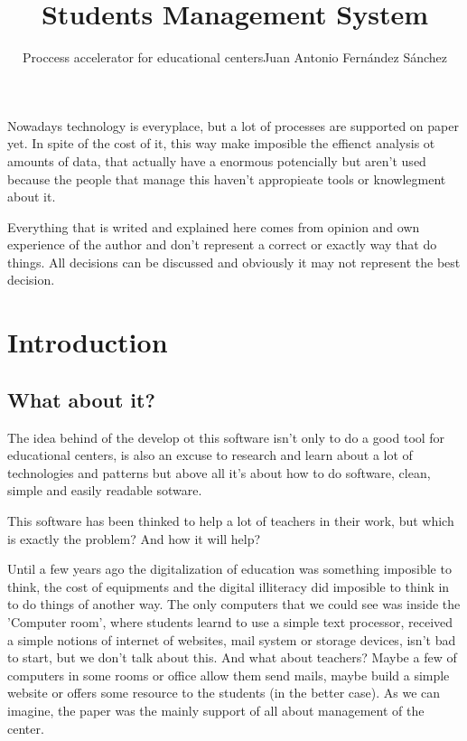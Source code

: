 \documentclass[oneside,english,titlepage]{scrbook}
\begin{document}
\title{Students Management System}

\subtitle{Proccess accelerator for educational centers}

\subtitle{Juan Antonio Fern\'andez S\'anchez}
\maketitle


Nowadays technology is everyplace, but a lot of processes are supported
on paper yet. In spite of the cost of it, this way make imposible
the effienct analysis ot amounts of data, that actually have a enormous
potencially but aren't used because the people that manage this haven't
appropieate tools or knowlegment about it.

\pagebreak{}


Everything that is writed and explained here comes from opinion and
own experience of the author and don't represent a correct or exactly
way that do things. All decisions can be discussed and obviously it
may not represent the best decision.

\pagebreak{}

\tableofcontents{}

\chapter{Introduction}

\section{What about it?}

The idea behind of the develop ot this software isn't only to do a
good tool for educational centers, is also an excuse to research and
learn about a lot of technologies and patterns but above all it's
about how to do software, clean, simple and easily readable sotware.

This software has been thinked to help a lot of teachers in their
work, but which is exactly the problem? And how it will help?

Until a few years ago the digitalization of education was something
imposible to think, the cost of equipments and the digital illiteracy
did imposible to think in to do things of another way. The only computers
that we could see was inside the 'Computer room', where students learnd
to use a simple text processor, received a simple notions of internet
of websites, mail system or storage devices, isn't bad to start, but
we don't talk about this. And what about teachers? Maybe a few of
computers in some rooms or office allow them send mails, maybe build
a simple website or offers some resource to the students (in the better
case). As we can imagine, the paper was the mainly support of all
about management of the center.
\end{document}
